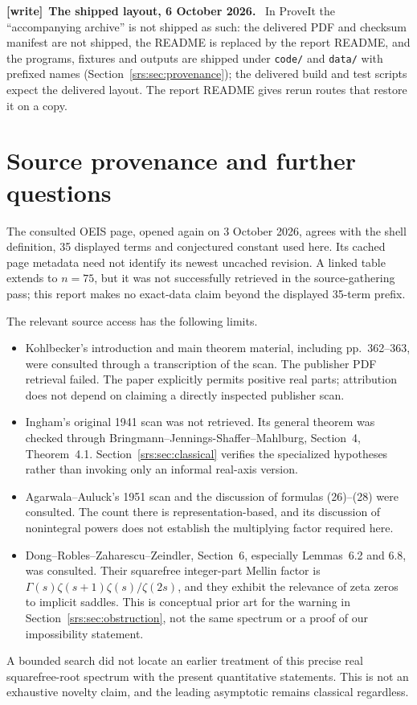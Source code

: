 \documentclass[11pt]{article}
\numberwithin{equation}{section}
\theoremstyle{remark}\newtheorem{remark}[theorem]{Remark}
\newcommand{\file}[1]{\nolinkurl{#1}}
\newenvironment{writenote}[1][]{\par\smallskip\begingroup\small
 \noindent\textbf{[write]}\if\relax\detokenize{#1}\relax\else~\textbf{#1.}\fi\ }%
 {\par\endgroup\smallskip}
\begin{document}
\begin{writenote}[The shipped layout, 6 October 2026]
In ProveIt the ``accompanying archive'' is not shipped as such: the delivered
PDF and checksum manifest are not shipped, the README is replaced by the
report README, and the programs, fixtures and outputs are shipped under
\file{code/} and \file{data/} with prefixed names
(Section~\ref{srs:sec:provenance}); the delivered build and test scripts
expect the delivered layout. The report README gives rerun routes that
restore it on a copy.
\end{writenote}

\section{Source provenance and further questions}\label{srs:sec:sources}
The consulted OEIS page, opened again on 3 October 2026, agrees with the shell definition, 35 displayed terms and conjectured constant used here. Its cached page metadata need not identify its newest uncached revision. A linked table extends to $n=75$, but it was not successfully retrieved in the source-gathering pass; this report makes no exact-data claim beyond the displayed 35-term prefix.

The relevant source access has the following limits.
\begin{itemize}[leftmargin=*]
\item Kohlbecker's introduction and main theorem material, including pp.~362--363, were consulted through a transcription of the scan. The publisher PDF retrieval failed. The paper explicitly permits positive real parts; attribution does not depend on claiming a directly inspected publisher scan.
\item Ingham's original 1941 scan was not retrieved. Its general theorem was checked through Bringmann--Jennings-Shaffer--Mahlburg, Section~4, Theorem~4.1. Section~\ref{srs:sec:classical} verifies the specialized hypotheses rather than invoking only an informal real-axis version.
\item Agarwala--Auluck's 1951 scan and the discussion of formulas (26)--(28) were consulted. The count there is representation-based, and its discussion of nonintegral powers does not establish the multiplying factor required here.
\item Dong--Robles--Zaharescu--Zeindler, Section~6, especially Lemmas~6.2 and 6.8, was consulted. Their squarefree integer-part Mellin factor is $\Gamma(s)\zeta(s+1)\zeta(s)/\zeta(2s)$, and they exhibit the relevance of zeta zeros to implicit saddles. This is conceptual prior art for the warning in Section~\ref{srs:sec:obstruction}, not the same spectrum or a proof of our impossibility statement.
\end{itemize}
A bounded search did not locate an earlier treatment of this precise real squarefree-root spectrum with the present quantitative statements. This is not an exhaustive novelty claim, and the leading asymptotic remains classical regardless.
\end{document}
